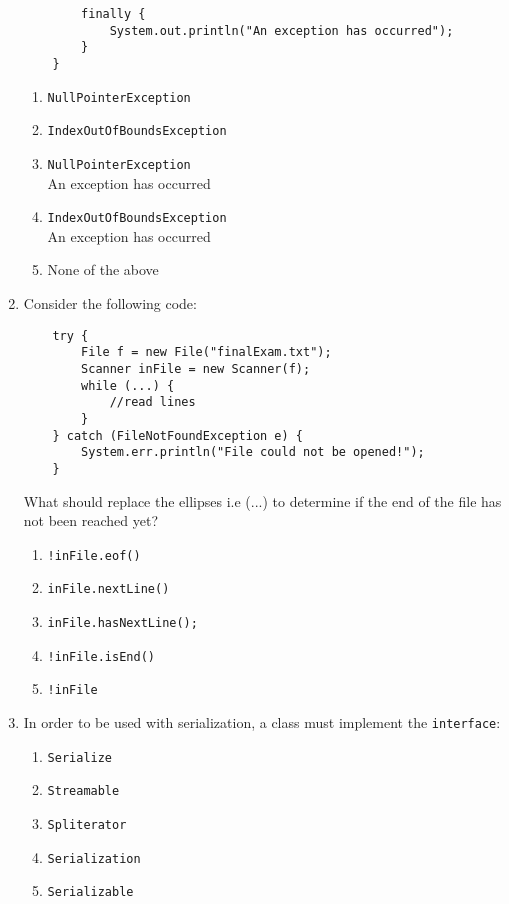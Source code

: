\documentclass[S17-Final.tex]{subfiles}
\begin{document}
\begin{enumerate}
\begin{lstlisting}
        finally {
            System.out.println("An exception has occurred");
        }
    }
\end{lstlisting}
	
\begin{enumerate}
\item  \texttt{NullPointerException}
\item  \texttt{IndexOutOfBoundsException}
\item  \texttt{NullPointerException}\\An exception has occurred
\item  \texttt{IndexOutOfBoundsException}\\An exception has occurred
\item  None of the above
\end{enumerate}

\item Consider the following code:
\begin{lstlisting}
    try {
        File f = new File("finalExam.txt");
        Scanner inFile = new Scanner(f);
        while (...) {
            //read lines
        }
    } catch (FileNotFoundException e) {
        System.err.println("File could not be opened!");
    }
\end{lstlisting}

What should replace the ellipses i.e (...) to determine if the end of the file has not been reached yet?
	
\begin{enumerate}
\item  \texttt{!inFile.eof()}
\item  \texttt{inFile.nextLine()}
\item  \texttt{inFile.hasNextLine();}
\item  \texttt{!inFile.isEnd()}
\item  \texttt{!inFile}
\end{enumerate}

\item In order to be used with serialization, a class must implement the \texttt{interface}:

\begin{enumerate}
\item  \texttt{Serialize}
\item  \texttt{Streamable}
\item  \texttt{Spliterator}
\item  \texttt{Serialization}
\item  \texttt{Serializable}
\end{enumerate}


\end{enumerate}
\end{document}

